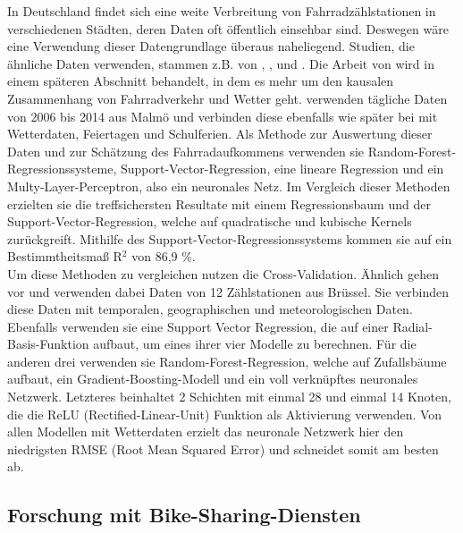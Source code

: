 \documentclass[a4paper,12pt]{thesis}
\begin{document}
In Deutschland findet sich eine weite Verbreitung von Fahrradzählstationen in verschiedenen Städten, deren Daten oft öffentlich einsehbar sind. Deswegen wäre eine Verwendung dieser Datengrundlage überaus naheliegend. Studien, die ähnliche Daten verwenden, stammen z.B. von \cite{Holmgren2017}, \cite{Broucke2019}, \cite{Wessel2020} und \cite{Goldmann2021}. Die Arbeit von \cite{Wessel2020} wird in einem späteren Abschnitt behandelt, in dem es mehr um den kausalen Zusammenhang von Fahrradverkehr und Wetter geht. \cite{Holmgren2017} verwenden tägliche Daten von 2006 bis 2014 aus Malmö und verbinden diese ebenfalls wie später bei \cite{Wessel2020} mit Wetterdaten, Feiertagen und Schulferien. Als Methode zur Auswertung dieser Daten und zur Schätzung des Fahrradaufkommens verwenden sie Random-Forest-Regressionssysteme, Support-Vector-Regression, eine lineare Regression und ein Multy-Layer-Perceptron, also ein neuronales Netz. Im Vergleich dieser Methoden erzielten sie die treffsichersten Resultate mit einem Regressionsbaum und der Support-Vector-Regression, welche auf quadratische und kubische Kernels zurückgreift. Mithilfe des Support-Vector-Regressionssystems kommen sie auf ein Bestimmtheitsmaß R$^2$ von 86,9 \%.\\
Um diese Methoden zu vergleichen nutzen \cite{Holmgren2017} die Cross-Validation. Ähnlich gehen \cite{Broucke2019} vor und verwenden dabei Daten von 12 Zählstationen aus Brüssel. Sie verbinden diese Daten mit temporalen, geographischen und meteorologischen Daten. Ebenfalls verwenden sie eine Support Vector Regression, die auf einer Radial-Basis-Funktion aufbaut, um eines ihrer vier Modelle zu berechnen. Für die anderen drei verwenden sie Random-Forest-Regression, welche auf Zufallsbäume aufbaut, ein Gradient-Boosting-Modell und ein voll verknüpftes neuronales Netzwerk. Letzteres beinhaltet 2 Schichten mit einmal 28 und einmal 14 Knoten, die die ReLU (Rectified-Linear-Unit) Funktion als Aktivierung verwenden. Von allen Modellen mit Wetterdaten erzielt das neuronale Netzwerk hier den niedrigsten RMSE (Root Mean Squared Error) und schneidet somit am besten ab.

\subsection{Forschung mit Bike-Sharing-Diensten}
\end{document}

